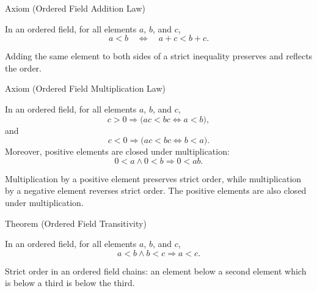 \NoLocalDependencies

\begin{axiombox}{Axiom (Ordered Field Addition Law)}
\begin{axiom}
\label{ax:ordered-field-addition-law}
In an ordered field, for all elements $a$, $b$, and $c$,
\[
a<b \quad\Longleftrightarrow\quad a+c<b+c.
\]
\end{axiom}
\end{axiombox}

\begin{remark*}[Interpretation]
Adding the same element to both sides of a strict inequality preserves and
reflects the order.
\end{remark*}

\NoLocalDependencies

\begin{axiombox}{Axiom (Ordered Field Multiplication Law)}
\begin{axiom}
\label{ax:ordered-field-multiplication-law}
In an ordered field, for all elements $a$, $b$, and $c$,
\[
c>0 \Longrightarrow
\bigl(ac<bc \Longleftrightarrow a<b\bigr),
\]
and
\[
c<0 \Longrightarrow
\bigl(ac<bc \Longleftrightarrow b<a\bigr).
\]
Moreover, positive elements are closed under multiplication:
\[
0<a \land 0<b \Longrightarrow 0<ab.
\]
\end{axiom}
\end{axiombox}

\begin{remark*}[Interpretation]
Multiplication by a positive element preserves strict order, while
multiplication by a negative element reverses strict order. The positive
elements are also closed under multiplication.
\end{remark*}

\NoLocalDependencies

\begin{theorembox}{Theorem (Ordered Field Transitivity)}
\begin{theorem}
\label{thm:ordered-field-transitivity}
In an ordered field, for all elements $a$, $b$, and $c$,
\[
a<b \land b<c \Longrightarrow a<c.
\]
\end{theorem}
\end{theorembox}

\begin{remark*}[Interpretation]
Strict order in an ordered field chains: an element below a second element
which is below a third is below the third.
\end{remark*}

